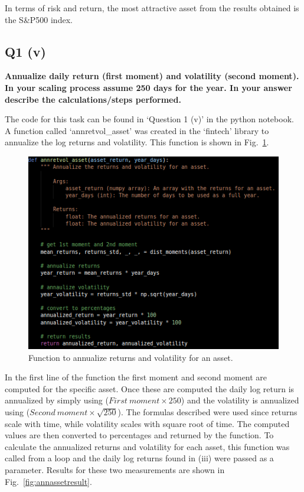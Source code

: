 \noindent
In terms of risk and return, the most attractive asset from the results obtained is the S\&P500 index. 



\subsection{Q1 (v)}\label{sssec:pt1q1v}

\textbf{Annualize daily return (first moment) and volatility (second moment). In your scaling process assume 250 days for the year. In your answer describe the calculations/steps performed.}

\noindent
The code for this task can be found in ‘Question 1 (v)’ in the python notebook. A function called ‘annretvol\_asset’ was created in the ‘fintech’ library to annualize the log returns and volatility. This function is shown in Fig.~\ref{fig:annasset}.  

\begin{figure}[H]
\centering
  \includegraphics[scale = .65]{imgs/annualize_asset.png}
  \caption{Function to annualize returns and volatility for an asset. }
  \label{fig:annasset}
\end{figure}

\noindent
In the first line of the function the first moment and second moment are computed for the specific asset. Once these are computed the daily log return is annualized by simply using ($First \ moment \times 250$) and the volatility is annualized using  ($Second \ moment \times \sqrt{250}$). The formulas described were used since returns scale with time, while volatility scales with square root of time. The computed values are then converted to percentages and returned by the function. To calculate the annualized returns and volatility for each asset, this function was called from a loop and the daily log returns found in (iii) were passed as a parameter. Results for these two measurements are shown in Fig.~\ref{fig:annassetresult}. 

